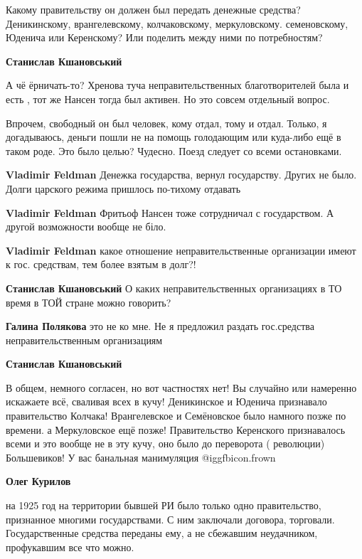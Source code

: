 \begin{itemize}
\begin{itemize}
Какому правительству он должен был передать денежные средства? Деникинскому,
врангелевскому, колчаковскому, меркуловскому. семеновскому, Юденича или
Керенскому? Или поделить между ними по потребностям?

\begin{itemize} %
\textbf{Станислав Кшановський} 

А чё ёрничать-то? Хренова туча неправительственных благотворителей была и есть
, тот же Нансен тогда был активен. Но это совсем отдельный вопрос.

Впрочем, свободный он был человек, кому отдал, тому и отдал. Только, я
догадываюсь, деньги пошли не на помощь голодающим или куда-либо ещё в таком
роде. Это было целью? Чудесно. Поезд следует со всеми остановками.


\textbf{Vladimir Feldman} Денежка государства, вернул государству. Других не было. Долги царского режима пришлось по-тихому отдавать

\textbf{Vladimir Feldman} Фритьоф Нансен тоже сотрудничал с государством. А другой возможности вообще не біло.

\textbf{Vladimir Feldman} какое отношение неправительственные организации имеют к гос. средствам, тем более взятым в долг?!

\textbf{Станислав Кшановський} О каких неправительственных организациях в ТО время в ТОЙ стране можно говорить?

\textbf{Галина Полякова} это не ко мне. Не я предложил раздать гос.средства неправительственным организациям

\textbf{Станислав Кшановський} 

В общем, немного согласен, но вот частностях нет! Вы случайно или намеренно
искажаете всё, сваливая всех в кучу! Деникинское и Юденича признавало
правительство Колчака! Врангелевское и Семёновское было намного позже по
времени. а Меркуловское ещё позже! Правительство Керенского признавалось всеми
и это вообще не в эту кучу, оно было до переворота ( революции) Большевиков! У
вас банальная манимуляция  @igg{fbicon.frown} 


\textbf{Олег Курилов} 

на 1925 год на территории бывшей РИ было только одно правительство, признанное
многими государствами. С ним заключали договора, торговали. Государственные
средства переданы ему, а не сбежавшим неудачником, профукавшим все что можно.


\end{itemize}
\end{itemize}
\end{itemize}
